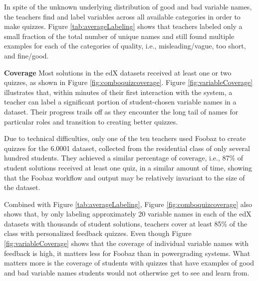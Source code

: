 In spite of the unknown underlying distribution of good and bad variable names, the teachers find and label variables across all available categories in order to make quizzes. Figure \ref{tab:averageLabeling} shows that teachers labeled only a small fraction of the total number of unique names and still found multiple examples for each of the categories of quality, i.e., misleading/vague, too short, and fine/good.

\textbf{Coverage} Most solutions in the edX datasets received at least one or two quizzes, as shown in Figure \ref{fig:comboquizcoverage}. Figure \ref{fig:variableCoverage} illustrates that, within minutes of their first interaction with the system, a teacher can label a significant portion of student-chosen variable names in a dataset. Their progress trails off as they encounter the long tail of names for particular roles and transition to creating better quizzes.

Due to technical difficulties, only one of the ten teachers used Foobaz to create quizzes for the 6.0001 dataset, collected from the residential class of only several hundred students. They achieved a similar percentage of coverage, i.e., 87\% of student solutions received at least one quiz, in a similar amount of time, showing that the Foobaz workflow and output may be relatively invariant to the size of the dataset.

Combined with Figure \ref{tab:averageLabeling}, Figure \ref{fig:comboquizcoverage} also shows that, by only labeling approximately 20 variable names in each of the edX datasets with thousands of student solutions, teachers cover at least 85\% of the class with personalized feedback quizzes. Even though Figure \ref{fig:variableCoverage} shows that the coverage of individual variable names with feedback is high, it matters less for Foobaz than in powergrading systems. What matters more is the coverage of students with quizzes that have examples of good and bad variable names students would not otherwise get to see and learn from.

